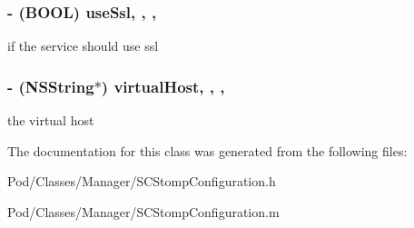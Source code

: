 \subsubsection[{\texorpdfstring{use\+Ssl}{useSsl}}]{\setlength{\rightskip}{0pt plus 5cm}-\/ (B\+O\+OL) use\+Ssl\hspace{0.3cm}{\ttfamily [read]}, {\ttfamily [write]}, {\ttfamily [nonatomic]}, {\ttfamily [assign]}}\hypertarget{interface_s_c_stomp_configuration_a9a176c86f9a4744628408fd741ae6250}{}\label{interface_s_c_stomp_configuration_a9a176c86f9a4744628408fd741ae6250}
if the service should use ssl 
\subsubsection[{\texorpdfstring{virtual\+Host}{virtualHost}}]{\setlength{\rightskip}{0pt plus 5cm}-\/ (N\+S\+String$\ast$) virtual\+Host\hspace{0.3cm}{\ttfamily [read]}, {\ttfamily [write]}, {\ttfamily [nonatomic]}, {\ttfamily [retain]}}\hypertarget{interface_s_c_stomp_configuration_ac56e7c704554c36ad37216643100753c}{}\label{interface_s_c_stomp_configuration_ac56e7c704554c36ad37216643100753c}
the virtual host 

The documentation for this class was generated from the following files\+:\begin{DoxyCompactItemize}
\item 
Pod/\+Classes/\+Manager/S\+C\+Stomp\+Configuration.\+h\item 
Pod/\+Classes/\+Manager/S\+C\+Stomp\+Configuration.\+m\end{DoxyCompactItemize}
